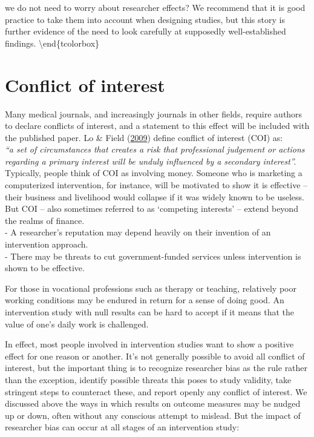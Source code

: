 \documentclass{krantz}
\begin{document}
we do not need to worry about researcher effects? We recommend that it is good practice to take them into account when designing studies, but this story is further evidence of the need to look carefully at supposedly well-established findings.
\textbackslash end\{tcolorbox\}

\hypertarget{conflict-of-interest}{%
\section{Conflict of interest}\label{conflict-of-interest}}

Many medical journals, and increasingly journals in other fields, require authors to declare conflicts of interest, and a statement to this effect will be included with the published paper. Lo \& Field (\protect\hyperlink{ref-lo2009}{2009}) define conflict of interest (COI) as:\\
\emph{``a set of circumstances that creates a risk that professional judgement or actions regarding a primary interest will be unduly influenced by a secondary interest''.}\\
Typically, people think of COI as involving money. Someone who is marketing a computerized intervention, for instance, will be motivated to show it is effective -- their business and livelihood would collapse if it was widely known to be useless. But COI -- also sometimes referred to as `competing interests' -- extend beyond the realms of finance.\\
- A researcher's reputation may depend heavily on their invention of an intervention approach.\\
- There may be threats to cut government-funded services unless intervention is shown to be effective.

For those in vocational professions such as therapy or teaching, relatively poor working conditions may be endured in return for a sense of doing good. An intervention study with null results can be hard to accept if it means that the value of one's daily work is challenged.

In effect, most people involved in intervention studies want to show a positive effect for one reason or another. It's not generally possible to avoid all conflict of interest, but the important thing is to recognize researcher bias as the rule rather than the exception, identify possible threats this poses to study validity, take stringent steps to counteract these, and report openly any conflict of interest. We discussed above the ways in which results on outcome measures may be nudged up or down, often without any conscious attempt to mislead. But the impact of researcher bias can occur at all stages of an intervention study:
\end{document}
